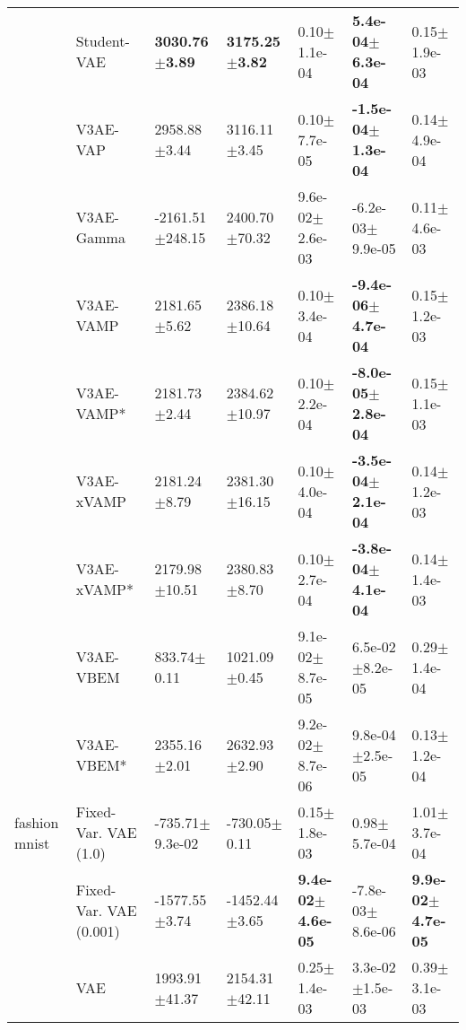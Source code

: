 \begin{tabular}{lllllll}
      & Student-VAE &    \textbf{3030.76$\pm$3.89} &    \textbf{3175.25$\pm$3.82} &              0.10$\pm$1.1e-04 &   \textbf{5.4e-04$\pm$6.3e-04} &              0.15$\pm$1.9e-03 \\
      & V3AE-VAP &             2958.88$\pm$3.44 &             3116.11$\pm$3.45 &              0.10$\pm$7.7e-05 &  \textbf{-1.5e-04$\pm$1.3e-04} &              0.14$\pm$4.9e-04 \\
      & V3AE-Gamma &          -2161.51$\pm$248.15 &            2400.70$\pm$70.32 &           9.6e-02$\pm$2.6e-03 &           -6.2e-03$\pm$9.9e-05 &              0.11$\pm$4.6e-03 \\
      & V3AE-VAMP &             2181.65$\pm$5.62 &            2386.18$\pm$10.64 &              0.10$\pm$3.4e-04 &  \textbf{-9.4e-06$\pm$4.7e-04} &              0.15$\pm$1.2e-03 \\
      & V3AE-VAMP* &             2181.73$\pm$2.44 &            2384.62$\pm$10.97 &              0.10$\pm$2.2e-04 &  \textbf{-8.0e-05$\pm$2.8e-04} &              0.15$\pm$1.1e-03 \\
      & V3AE-xVAMP &             2181.24$\pm$8.79 &            2381.30$\pm$16.15 &              0.10$\pm$4.0e-04 &  \textbf{-3.5e-04$\pm$2.1e-04} &              0.14$\pm$1.2e-03 \\
      & V3AE-xVAMP* &            2179.98$\pm$10.51 &             2380.83$\pm$8.70 &              0.10$\pm$2.7e-04 &  \textbf{-3.8e-04$\pm$4.1e-04} &              0.14$\pm$1.4e-03 \\
      & V3AE-VBEM &              833.74$\pm$0.11 &             1021.09$\pm$0.45 &           9.1e-02$\pm$8.7e-05 &            6.5e-02$\pm$8.2e-05 &              0.29$\pm$1.4e-04 \\
      & V3AE-VBEM* &             2355.16$\pm$2.01 &             2632.93$\pm$2.90 &           9.2e-02$\pm$8.7e-06 &            9.8e-04$\pm$2.5e-05 &              0.13$\pm$1.2e-04 \\
fashion mnist & Fixed-Var. VAE (1.0) &          -735.71$\pm$9.3e-02 &             -730.05$\pm$0.11 &              0.15$\pm$1.8e-03 &               0.98$\pm$5.7e-04 &              1.01$\pm$3.7e-04 \\
      & Fixed-Var. VAE (0.001) &            -1577.55$\pm$3.74 &            -1452.44$\pm$3.65 &  \textbf{9.4e-02$\pm$4.6e-05} &           -7.8e-03$\pm$8.6e-06 &  \textbf{9.9e-02$\pm$4.7e-05} \\
      & VAE &            1993.91$\pm$41.37 &            2154.31$\pm$42.11 &              0.25$\pm$1.4e-03 &            3.3e-02$\pm$1.5e-03 &              0.39$\pm$3.1e-03 \\

\end{tabular}
